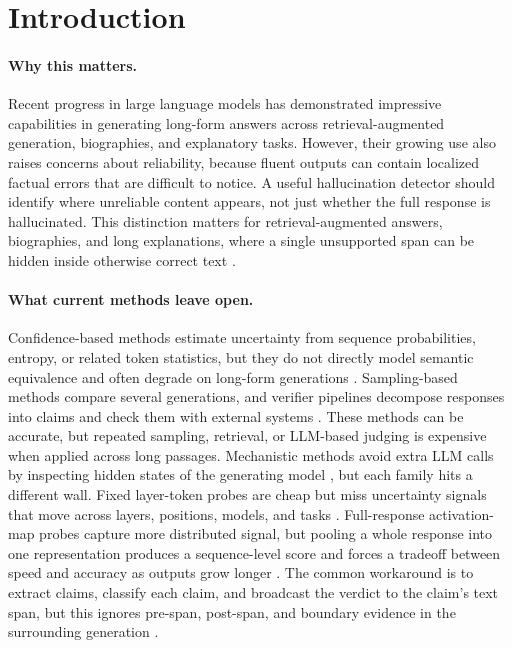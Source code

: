 \section{Introduction}



\paragraph{Why this matters.}
Recent progress in large language models has demonstrated impressive capabilities in generating long-form answers across retrieval-augmented generation, biographies, and explanatory tasks.
However, their growing use also raises concerns about reliability, because fluent outputs can contain localized factual errors that are difficult to notice. A useful hallucination detector should identify where unreliable content appears, not just whether the full response is hallucinated. This distinction matters for retrieval-augmented answers, biographies, and long explanations, where a single unsupported span can be hidden inside otherwise correct text
\citep{niu2024ragtruth,min2023,wei2024}.

\paragraph{What current methods leave open.}
Confidence-based methods estimate uncertainty from sequence probabilities,
entropy, or related token statistics, but they do not directly model semantic
equivalence and often degrade on long-form generations
\citep{malinin2021uncertainty,duan2024shifting,schweighofer2025rethinking}.
Sampling-based methods compare several generations, and verifier pipelines
decompose responses into claims and check them with external systems
\citep{kuhn2023semantic,lin2024generating,jiang2024,manakul2023,min2023,zhao2024}.
These methods can be accurate, but repeated sampling, retrieval, or LLM-based
judging is expensive when applied across long passages. Mechanistic methods avoid
extra LLM calls by inspecting hidden states of the generating model
\citep{azaria2023,marks2023,liu2024,ji2024}, but each family hits a different
wall. Fixed layer-token probes are cheap but miss uncertainty signals that move
across layers, positions, models, and tasks \citep{kadavath2022,orgad2024}.
Full-response activation-map probes capture more distributed signal, but pooling
a whole response into one representation produces a sequence-level score and
forces a tradeoff between speed and accuracy as outputs grow longer
\citep{barshalom2025}. The common workaround is to extract claims, classify each
claim, and broadcast the verdict to the claim's text span, but this ignores
pre-span, post-span, and boundary evidence in the surrounding generation
\citep{snyder2024,he2024}.

